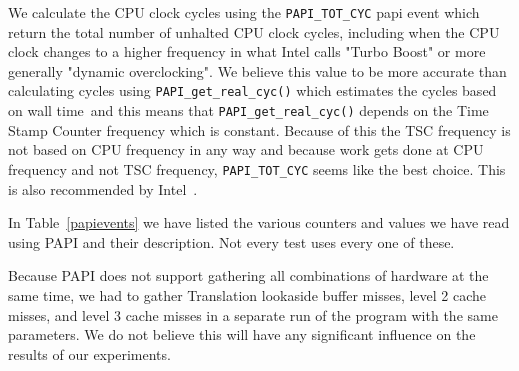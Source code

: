 We calculate the CPU clock cycles using the \texttt{PAPI\_TOT\_CYC} papi event which return the total number of unhalted CPU clock cycles, including when the CPU clock changes to a higher frequency in what Intel calls "Turbo Boost" or more generally "dynamic overclocking".
We believe this value to be more accurate than calculating cycles using \texttt{PAPI\_get\_real\_cyc()} which estimates the cycles based on wall time~\citep{PAPI-get-real-cyc}and this means that \texttt{PAPI\_get\_real\_cyc()} depends on the Time Stamp Counter frequency which is constant. 
Because of this the TSC frequency is not based on CPU frequency in any way and because work gets done at CPU frequency and not TSC frequency, \texttt{PAPI\_TOT\_CYC} seems like the best choice. 
This is also recommended by Intel~\citep{IntelMeasuringTheAverageUnhaltedFrequency}.

In Table~\ref{papievents} we have listed the various counters and values we have read using PAPI and their description. Not every test uses every one of these.

Because PAPI does not support gathering all combinations of hardware at the same time, we had to gather Translation lookaside buffer misses, level 2 cache misses, and level 3 cache misses in a separate run of the program with the same parameters.
We do not believe this will have any significant influence on the results of our experiments.

